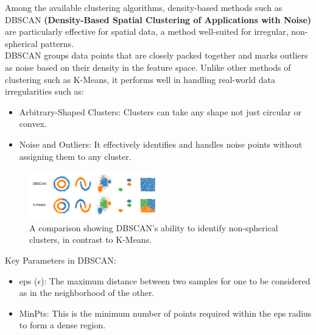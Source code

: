 \documentclass[12pt,a4paper,oneside,english]{book}
\begin{document}
{Among the available clustering algorithms, density-based methods such as DBSCAN \textbf{(Density-Based Spatial Clustering of Applications with Noise) } \cite{BIRANT2007208dbscan} are particularly effective for spatial data, a method well-suited for irregular,
 non-spherical patterns.
 \\
DBSCAN groups data points that are closely packed together and marks outliers as noise based on their density in the feature space.
Unlike other methods of clustering such as K-Means, it performs well in handling real-world data irregularities such as:
\begin{itemize}
    \item Arbitrary-Shaped Clusters: Clusters can take any shape not just circular or convex.
    \item Noise and Outliers: It effectively identifies and handles noise points without assigning them to any cluster.
\end{itemize}

\begin{figure}[h!] %
    \centering
    \includegraphics[width=0.5\textwidth]{images/dbscanVSkmeans.png}
    \captionsetup{width=0.6\textwidth}
    \caption{A comparison showing DBSCAN's ability to identify non-spherical clusters, in contrast to K-Means.}
    \label{fig:dbscan_vs_kmeans}
\end{figure}

Key Parameters in DBSCAN:
\begin{itemize}
    \item eps ($\epsilon$): The maximum distance between two samples for one to be considered as in the neighborhood of the other.
    \item MinPts: This is the minimum number of points required within the eps radius to form a dense region. 
\end{itemize}


}
\end{document}
